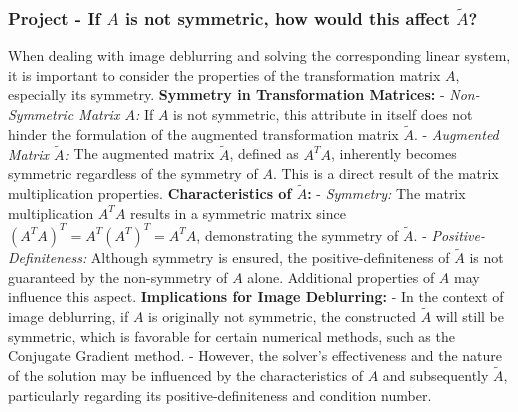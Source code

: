 \documentclass[unicode,11pt,a4paper,oneside,numbers=endperiod,openany]{scrartcl}
\begin{document}
\subsubsection{Project - If $A$ is not symmetric, how would this affect $\tilde{A}$?}
When dealing with image deblurring and solving the corresponding linear system, it is important to consider the properties of the transformation matrix \( A \), especially its symmetry.
\newline\newline
\textbf{Symmetry in Transformation Matrices:}
- \textit{Non-Symmetric Matrix \( A \):} If \( A \) is not symmetric, this attribute in itself does not hinder the formulation of the augmented transformation matrix \( \tilde{A} \).
- \textit{Augmented Matrix \( \tilde{A} \):} The augmented matrix \( \tilde{A} \), defined as \( A^TA \), inherently becomes symmetric regardless of the symmetry of \( A \). This is a direct result of the matrix multiplication properties.
\newline\newline
\textbf{Characteristics of \( \tilde{A} \):}
- \textit{Symmetry:} The matrix multiplication \( A^TA \) results in a symmetric matrix since \( (A^TA)^T = A^T(A^T)^T = A^TA \), demonstrating the symmetry of \( \tilde{A} \).
- \textit{Positive-Definiteness:} Although symmetry is ensured, the positive-definiteness of \( \tilde{A} \) is not guaranteed by the non-symmetry of \( A \) alone. Additional properties of \( A \) may influence this aspect.
\newline\newline
\textbf{Implications for Image Deblurring:}
- In the context of image deblurring, if \( A \) is originally not symmetric, the constructed \( \tilde{A} \) will still be symmetric, which is favorable for certain numerical methods, such as the Conjugate Gradient method.
- However, the solver's effectiveness and the nature of the solution may be influenced by the characteristics of \( A \) and subsequently \( \tilde{A} \), particularly regarding its positive-definiteness and condition number.
\end{document}
